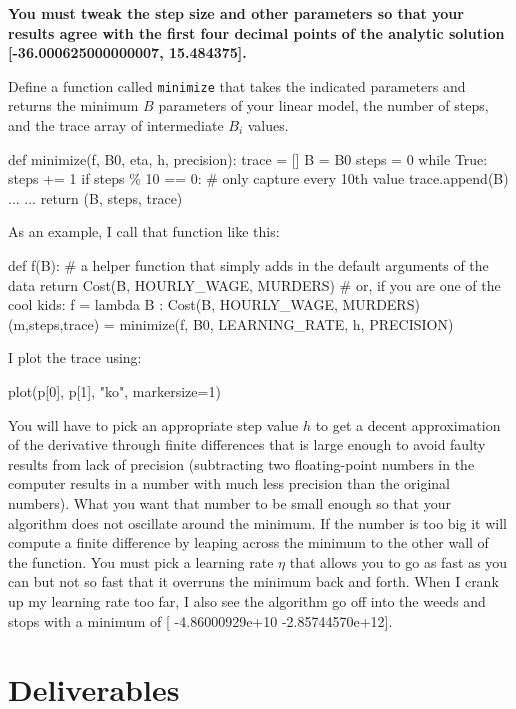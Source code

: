 \begin{fullwidth}
{\bf You must tweak the step size and other parameters so that your results agree with the first four decimal points of the analytic solution [-36.000625000000007, 15.484375].}

Define a function called {\tt minimize} that takes the indicated parameters and returns the minimum $B$ parameters of your linear model, the number of steps, and the trace array of intermediate $B_i$ values.

\begin{pyverbatim}
def minimize(f, B0, eta, h, precision):
    trace = []
    B = B0
    steps = 0 
    while True:
        steps += 1
        if steps \% 10 == 0: # only capture every 10th value
            trace.append(B)
        ...     
    ... 
    return (B, steps, trace)
\end{pyverbatim}

As an example, I call that function like this:

\begin{pyverbatim}
def f(B): # a helper function that simply adds in the default arguments of the data
    return Cost(B, HOURLY_WAGE, MURDERS)
# or, if you are one of the cool kids:
f = lambda B : Cost(B, HOURLY_WAGE, MURDERS)
(m,steps,trace) = minimize(f, B0, LEARNING_RATE, h, PRECISION)
\end{pyverbatim}

\noindent I plot the trace using:

\begin{pyverbatim}
plot(p[0], p[1], "ko", markersize=1)
\end{pyverbatim}

You will have to pick an appropriate step value $h$ to get a decent approximation of the derivative through finite differences that is large enough to avoid faulty results from lack of precision (subtracting two floating-point numbers in the computer results in a number with much less precision than the original numbers). What you want that number to be small enough so that your algorithm does not oscillate around the minimum. If the number is too big it will compute a finite difference by leaping across the minimum to the other wall of the function. You must pick a learning rate $\eta$ that allows you to go as fast as you can but not so fast that it overruns the minimum back and forth. When I crank up my learning rate too far, I also see the algorithm go off into the weeds and stops with a minimum of [ -4.86000929e+10  -2.85744570e+12].

\section{Deliverables}


\end{fullwidth}

